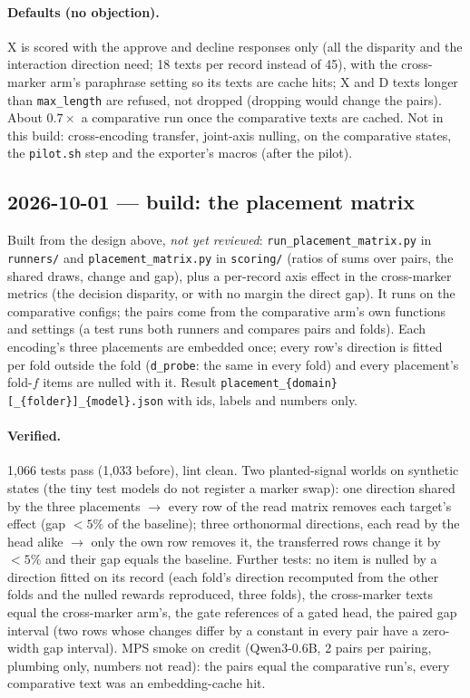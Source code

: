 \documentclass{article}
\begin{document}
\paragraph{Defaults (no objection).} X is scored with the approve and decline responses only (all the disparity and the
interaction direction need; 18 texts per record instead of 45), with the cross-marker arm's paraphrase setting so its
texts are cache hits; X and D texts longer than \texttt{max\_length} are refused, not dropped (dropping would change the
pairs). About $0.7\times$ a comparative run once the comparative texts are cached. Not in this build: cross-encoding
transfer, joint-axis nulling, \leace{} on the comparative states, the \texttt{pilot.sh} step and the exporter's macros
(after the pilot).

\subsection*{2026-10-01 --- build: the placement matrix}
Built from the design above, \emph{not yet reviewed}: \texttt{run\_placement\_matrix.py} in \texttt{runners/} and
\texttt{placement\_matrix.py} in \texttt{scoring/} (ratios of sums over pairs, the shared draws, change and gap), plus a
per-record axis effect in the cross-marker metrics (the decision disparity, or with no margin the direct gap). It runs
on the comparative configs; the pairs come from the comparative arm's own functions and settings (a test runs both
runners and compares pairs and folds). Each encoding's three placements are embedded once; every row's direction is
fitted per fold outside the fold (\texttt{d\_probe}: the same in every fold) and every placement's fold-$f$ items are
nulled with it. Result \texttt{placement\_\{domain\}[\_\{folder\}]\_\{model\}.json} with ids, labels and numbers only.

\paragraph{Verified.} 1{,}066 tests pass (1{,}033 before), lint clean. Two planted-signal worlds on synthetic states
(the tiny test models do not register a marker swap): one direction shared by the three placements $\to$ every row of
the read matrix removes each target's effect (gap $<5\%$ of the baseline); three orthonormal directions, each read by
the head alike $\to$ only the own row removes it, the transferred rows change it by $<5\%$ and their gap equals the
baseline. Further tests: no item is nulled by a direction fitted on its record (each fold's direction recomputed from
the other folds and the nulled rewards reproduced, three folds), the cross-marker texts equal the cross-marker arm's,
the gate references of a gated head, the paired gap interval (two rows whose changes differ by a constant in every
pair have a zero-width gap interval). MPS smoke on credit (Qwen3-0.6B, 2 pairs per pairing, plumbing only, numbers not
read): the pairs equal the comparative run's, every comparative text was an embedding-cache hit.
\end{document}
